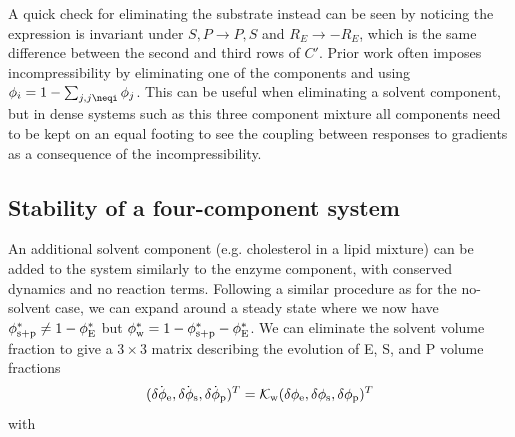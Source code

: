 A quick check for eliminating the substrate instead can be seen by noticing the expression is invariant under $S, P \rightarrow P, S$ and $R_E \rightarrow -R_E$, which is the same difference between the second and third rows of $C'$. Prior work often imposes incompressibility by eliminating one of the components and using $\phi_i = 1-\sum_{j,j\neqi}\phi_j$. This can be useful when eliminating a solvent component, but in dense systems such as this three component mixture all components need to be kept on an equal footing to see the coupling between responses to gradients as a consequence of the incompressibility.

\subsection{Stability of a four-component system}

An additional solvent component (e.g. cholesterol in a lipid mixture) can be added to the system similarly to the enzyme component, with conserved dynamics and no reaction terms. Following a similar procedure as for the no-solvent case, we can expand around a steady state where we now have $\phi_{\mathrm{s+p}}^* \neq 1 - \phi^*_\mathrm{E}$ but $\phi_{\mathrm{w}}^* = 1 - \phi_{\mathrm{s+p}}^* - \phi^*_\mathrm{E}$. We can eliminate the solvent volume fraction to give a $3\times3$ matrix describing the evolution of E, S, and P volume fractions
\begin{equation}
    (\dot{\delta\phi_{\mathrm{e}}}, \dot{\delta\phi_{\mathrm{s}}}, \dot{\delta\phi_{\mathrm{p}}})^T = {\cal K}_{\rm w}(\delta\phi_{\mathrm{e}}, \delta\phi_{\mathrm{s}}, \delta\phi_{\mathrm{p}})^T    
\end{equation}
with
\newline
\noindent
{}

